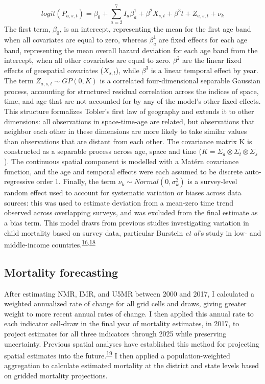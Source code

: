 \documentclass[
]{article}
\begin{document}
\[logit(P_{a,s,t})=\beta_0+\sum_{a=2}^{7}{I_a\beta_a^1 + \beta^2X_{s,t} + \beta^3t + Z_{a,s,t} + \nu_{k}}\]
The first term, \(\beta_0\), is an intercept, representing the mean for the first age band when all covariates are equal to zero, whereas \(\beta_a^1\) are fixed effects for each age band, representing the mean overall hazard deviation for each age band from the intercept, when all other covariates are equal to zero. \(\beta^2\) are the linear fixed effects of geospatial covariates (\(X_{s,t}\)), while \(\beta^3\) is a linear temporal effect by year. The term \(Z_{a,s,t} \sim GP(0, K)\) is a correlated four-dimensional separable Gaussian process, accounting for structured residual correlation across the indices of space, time, and age that are not accounted for by any of the model's other fixed effects. This structure formalizes Tobler's first law of geography and extends it to other dimensions: all observations in space-time-age are related, but observations that neighbor each other in these dimensions are more likely to take similar values than observations that are distant from each other. The covariance matrix K is constructed as a separable process across age, space and time (\(K = \Sigma_a \otimes \Sigma_t \otimes \Sigma_s\)). The continuous spatial component is modelled with a Matérn covariance function, and the age and temporal effects were each assumed to be discrete auto-regressive order 1. Finally, the term \(\nu_k \sim Normal(0,\sigma^2_k)\) is a survey-level random effect used to account for systematic variation or biases across data sources: this was used to estimate deviation from a mean-zero time trend observed across overlapping surveys, and was excluded from the final estimate as a bias term. This model draws from previous studies investigating variation in child mortality based on survey data, particular Burstein \emph{et al}'s study in low- and middle-income countries.\textsuperscript{\protect\hyperlink{ref-Burstein2019}{16},\protect\hyperlink{ref-Wakefield2019}{18}}

\hypertarget{mortality-forecasting}{%
\subsection{Mortality forecasting}\label{mortality-forecasting}}

After estimating NMR, IMR, and U5MR between 2000 and 2017, I calculated a weighted annualized rate of change for all grid cells and draws, giving greater weight to more recent annual rates of change. I then applied this annual rate to each indicator cell-draw in the final year of mortality estimates, in 2017, to project estimates for all three indicators through 2025 while preserving uncertainty. Previous spatial analyses have established this method for projecting spatial estimates into the future.\textsuperscript{\protect\hyperlink{ref-Osgood-Zimmerman2018}{19}} I then applied a population-weighted aggregation to calculate estimated mortality at the district and state levels based on gridded mortality projections.
\end{document}
